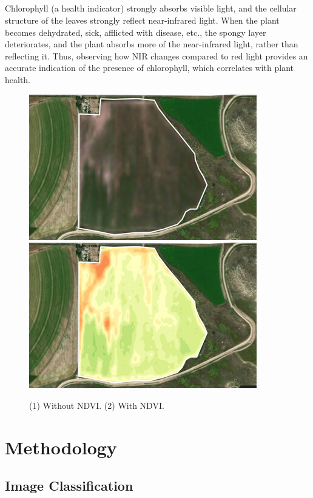 \documentclass[12pt, a4paper]{report}
\begin{document}
\paragraph{}
Chlorophyll (a health indicator) strongly absorbs visible light, and the cellular structure of the leaves strongly reflect near-infrared light. When the plant becomes dehydrated, sick, afflicted with disease, etc., the spongy layer deteriorates, and the plant absorbs more of the near-infrared light, rather than reflecting it. Thus, observing how NIR changes compared to red light provides an accurate indication of the presence of chlorophyll, which correlates with plant health.
\begin{figure}[ht!]
\includegraphics[width=.45\textwidth]{ndvisampleone.jpg}\hfill
\includegraphics[width=.45\textwidth]{ndvisampletwo.jpg}
\caption{(1) Without NDVI. (2) With NDVI.}
\end{figure}
\newpage


\chapter{Methodology}
\section{Image Classification}
\end{document}
